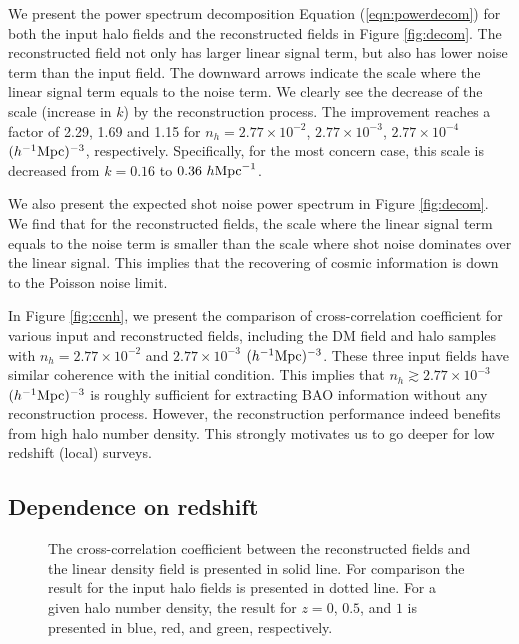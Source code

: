 \documentclass[iop]{emulateapj}
\newcommand{\mpch}{h^{-1} {\rm Mpc}}
\newcommand{\hmpc}{h {\rm Mpc}^{-1}}
\begin{document}
{We present the power spectrum decomposition Equation (\ref{eqn:powerdecom}) for both the input halo fields and the reconstructed fields in Figure \ref{fig:decom}.
The reconstructed field not only has larger linear signal term, but also has lower noise term than the input field.
The downward arrows indicate the scale where the linear signal term equals to the noise term.
We clearly see the decrease of the scale (increase in $k$) by the reconstruction process.
The improvement reaches a factor of 2.29, 1.69 and 1.15 for $n_h=2.77\times 10^{-2}$, $2.77\times 10^{-3}$, $2.77\times 10^{-4}$ $(\mpch)^{-3}$, respectively.
Specifically, for the most concern case, this scale is decreased from $k=0.16$ to $0.36\ \hmpc$.

We also present the expected shot noise power spectrum in Figure \ref{fig:decom}.
We find that for the reconstructed fields, the scale where the linear signal term equals to the noise term is smaller than the scale where shot noise dominates over the linear signal.
This implies that the recovering of cosmic information is down to the Poisson noise limit.

In Figure \ref{fig:ccnh}, we present the comparison of cross-correlation coefficient for various input and reconstructed fields, including the DM field and halo samples with $n_h=2.77\times 10^{-2}$ and $2.77\times 10^{-3}$ $(\mpch)^{-3}$.
These three input fields have similar coherence with the initial condition.
This implies that $n_h\gtrsim 2.77\times 10^{-3}$ $(\mpch)^{-3}$ is roughly sufficient for extracting BAO information without any reconstruction process.
However, the reconstruction performance indeed benefits from high halo number density.
This strongly motivates us to go deeper for low redshift (local) surveys.

\subsection{Dependence on redshift}
\label{sec:evo}

\begin{figure}
\epsfxsize=8.5cm
\caption{The cross-correlation coefficient between the reconstructed fields and the linear density field is presented in solid line.
For comparison the result for the input halo fields is presented in dotted line.
For a given halo number density, the result for $z=0$, $0.5$, and $1$ is presented in blue, red, and green, respectively.}
\label{fig:numevo}
\end{figure}

}
\end{document}
